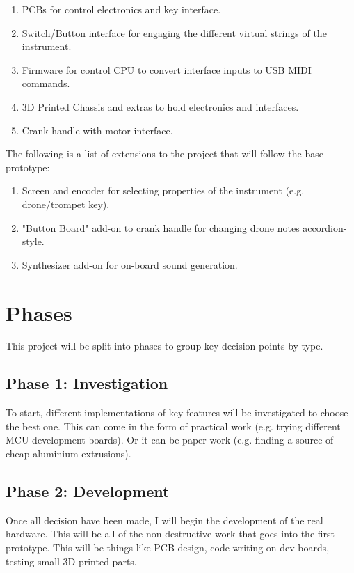 \documentclass[12pt]{article}
\begin{document}
\begin{enumerate}
    \item PCBs for control electronics and key interface.
    \item Switch/Button interface for engaging the different virtual strings of the instrument. 
    \item Firmware for control CPU to convert interface inputs to USB MIDI commands. 
    \item 3D Printed Chassis and extras to hold electronics and interfaces.
    \item Crank handle with motor interface. 
\end{enumerate}

The following is a list of extensions to the project that will follow the base prototype:

\begin{enumerate}
    \item Screen and encoder for selecting properties of the instrument (e.g. drone/trompet key).
    \item "Button Board" add-on to crank handle for changing drone notes accordion-style.
    \item Synthesizer add-on for on-board sound generation. 
\end{enumerate}


\section{Phases}
This project will be split into phases to group key decision points by type.

\subsection{Phase 1: Investigation}
To start, different implementations of key features will be investigated to choose the best one. 
This can come in the form of practical work (e.g. trying different MCU development boards).
Or it can be paper work (e.g. finding a source of cheap aluminium extrusions). 

\subsection{Phase 2: Development}
Once all decision have been made, I will begin the development of the real hardware.
This will be all of the non-destructive work that goes into the first prototype.
This will be things like PCB design, code writing on dev-boards, testing small 3D printed parts.  
\end{document}
